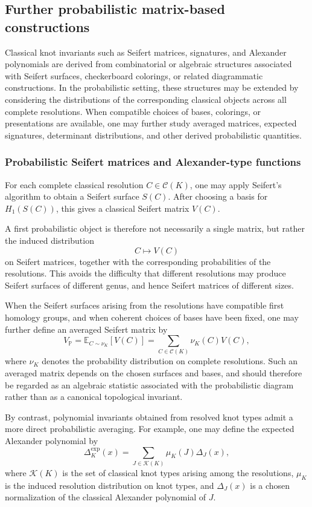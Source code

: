 \documentclass[a4paper, reqno, 12pt]{amsart}
\theoremstyle{plain}
\theoremstyle{definition}
\begin{document}
\subsection{Further probabilistic matrix-based constructions}

Classical knot invariants such as Seifert matrices, signatures, and Alexander polynomials are derived from combinatorial or algebraic structures associated with Seifert surfaces, checkerboard colorings, or related diagrammatic constructions. In the probabilistic setting, these structures may be extended by considering the distributions of the corresponding classical objects across all complete resolutions. When compatible choices of bases, colorings, or presentations are available, one may further study averaged matrices, expected signatures, determinant distributions, and other derived probabilistic quantities.



\subsubsection*{Probabilistic Seifert matrices and Alexander-type functions}

For each complete classical resolution \(C\in\mathcal C(K)\), one may apply Seifert's algorithm to obtain a Seifert surface \(S(C)\). After choosing a basis for \(H_1(S(C))\), this gives a classical Seifert matrix \(V(C)\).

A first probabilistic object is therefore not necessarily a single matrix, but rather the induced distribution
\[
C\longmapsto V(C)
\]
on Seifert matrices, together with the corresponding probabilities of the resolutions. This avoids the difficulty that different resolutions may produce Seifert surfaces of different genus, and hence Seifert matrices of different sizes.

When the Seifert surfaces arising from the resolutions have compatible first homology groups, and when coherent choices of bases have been fixed, one may further define an averaged Seifert matrix by
\[
V_{\mathbb P}
=
\mathbb E_{C\sim \nu_K}[V(C)]
=
\sum_{C\in\mathcal C(K)}
\nu_K(C)V(C),
\]
where \(\nu_K\) denotes the probability distribution on complete resolutions. Such an averaged matrix depends on the chosen surfaces and bases, and should therefore be regarded as an algebraic statistic associated with the probabilistic diagram rather than as a canonical topological invariant.

By contrast, polynomial invariants obtained from resolved knot types admit a more direct probabilistic averaging. For example, one may define the expected Alexander polynomial by
\[
\Delta_K^{\mathrm{exp}}(x)
=
\sum_{J\in\mathcal K(K)}
\mu_K(J)\Delta_J(x),
\]
where \(\mathcal K(K)\) is the set of classical knot types arising among the resolutions, \(\mu_K\) is the induced resolution distribution on knot types, and \(\Delta_J(x)\) is a chosen normalization of the classical Alexander polynomial of \(J\).
\end{document}
